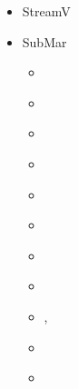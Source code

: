 \begin{itemize}
\begin{scriptsize}
\begin{itemize}
\item[\twothousandtwenty]    \textcite{lalt20},  \textcite{gugb20},
                             \textcite{yabt20},  \textcite{arcf20}, 
                             \textcite{rits20},  \textcite{grlc20}, 
                             \textcite{scrt20},  \textcite{lorb20},
                             \textcite{bobm20},  \textcite{kacc20},
                             \textcite{uprc20}
\item[\twothousandtwentyone] \textcite{roac21},  \textcite{lalt21}, \textcite{mebl21},
                             \textcite{gult21},  \textcite{gubt21}
\item[\twothousandtwentytwo] \textcite{lids22},  \textcite{hulz22}, \textcite{adss22},
                             \textcite{bamo22},  \textcite{lalt22}
\item[\twothousandtwentythree] \textcite{quzj23}, \textcite{titl23}, \textcite{lizl23},
                               \textcite{adsm23}, \textcite{gudl23}
\end{itemize}
\end{scriptsize}


\item {\codefont StreamV} 

\textcite{samu12b}
\textcite{sasa23}

\item {\codefont SubMar} 

\begin{scriptsize}
\begin{itemize}
\item[\twothousandsix]       \textcite{masr06}
\item[\twothousandseven]     \textcite{masp07}
\item[\twothousandten]       \textcite{roms10}
\item[\twothousandtwelve]    \textcite{rosm12}
\item[\twothousandthirteen]  \textcite{rems13}
\item[\twothousandseventeen] \textcite{rerm17}
\item[\twothousandeighteen]  \textcite{marc18}
\item[\twothousandnineteen]  \textcite{rors19}
\item[\twothousandtwenty]    \textcite{rozr20}, \textcite{relr20}
\item[\twothousandtwentyone] \textcite{resr21}
\item[\twothousandtwentytwo] \textcite{bors22}
\end{itemize}
\end{scriptsize}


\end{itemize}
